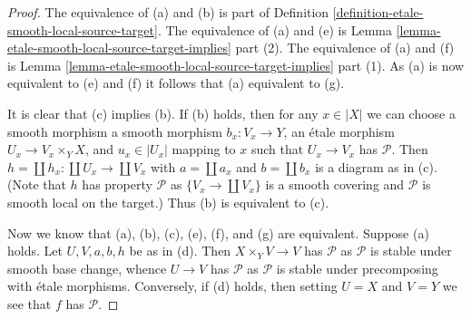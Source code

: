\documentclass[10pt,a4paper]{amsart}
\theoremstyle{plain}
\theoremstyle{definition}
\theoremstyle{remark}
\numberwithin{equation}{subsection}
\begin{document}
\begin{proof}
The equivalence of (a) and (b) is part of
Definition \ref{definition-etale-smooth-local-source-target}.
The equivalence of (a) and (e) is
Lemma \ref{lemma-etale-smooth-local-source-target-implies} part (2).
The equivalence of (a) and (f) is
Lemma \ref{lemma-etale-smooth-local-source-target-implies} part (1).
As (a) is now equivalent to (e) and (f) it follows that
(a) equivalent to (g).

\medskip\noindent
It is clear that (c) implies (b). If (b) holds, then for any
$x \in |X|$ we can choose a smooth morphism a smooth morphism
$b_x : V_x \to Y$, an \'etale morphism $U_x \to V_x \times_Y X$,
and $u_x \in |U_x|$ mapping to $x$
such that $U_x \to V_x$ has $\mathcal{P}$.
Then $h = \coprod h_x : \coprod U_x \to \coprod V_x$
with $a = \coprod a_x$ and $b = \coprod b_x$ is a diagram as in (c).
(Note that $h$ has property $\mathcal{P}$ as $\{V_x \to \coprod V_x\}$
is a smooth covering and $\mathcal{P}$ is smooth local on the target.)
Thus (b) is equivalent to (c).

\medskip\noindent
Now we know that (a), (b), (c), (e), (f), and (g) are equivalent.
Suppose (a) holds. Let $U, V, a, b, h$ be as in (d). Then
$X \times_Y V \to V$ has $\mathcal{P}$ as $\mathcal{P}$ is stable under
smooth base change, whence $U \to V$ has $\mathcal{P}$ as $\mathcal{P}$
is stable under precomposing with \'etale morphisms. Conversely, if (d)
holds, then setting $U = X$ and $V = Y$ we see that $f$ has $\mathcal{P}$.
\end{proof}
\end{document}
